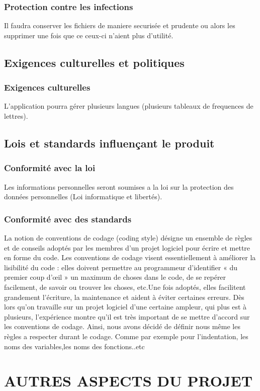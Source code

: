 \documentclass[a4]{article}
\begin{document}
			\subsubsection {Protection contre les infections}
				Il faudra conserver les fichiers de maniere securisée et prudente ou alors les supprimer une 					fois que ce ceux-ci n'aient plus d'utilité.
		\subsection{Exigences culturelles et politiques}
			\subsubsection {Exigences culturelles}
				L'application pourra gérer plusieurs langues (plusieurs tableaux de frequences de lettres).
		\subsection{Lois et standards influençant le produit}
			\subsubsection {Conformité avec la loi}
				Les informations personnelles seront soumises a la loi sur la protection des données
				personnelles (Loi informatique et libertés).
			\subsubsection {Conformité avec des standards}
La notion de conventions de codage (coding style) désigne un ensemble de règles et de conseils 
adoptés par les membres d’un projet logiciel pour écrire et mettre en forme du code.
Les conventions de codage visent essentiellement à améliorer la lisibilité du code : elles doivent 
permettre au programmeur d’identifier « du premier coup d’œil » un maximum de choses dans 
le  code, de se repérer facilement, de savoir ou trouver les choses, etc.Une fois adoptés, elles
facilitent grandement l’écriture, la maintenance et aident à éviter certaines erreurs.
Dès lors qu’on travaille sur un projet logiciel d’une certaine ampleur, qui plus est à
plusieurs, l’expérience montre qu’il est très important de se mettre d’accord sur les
conventions de codage. Ainsi, nous avons décidé de définir nous même les règles a respecter durant le codage. Comme par exemple pour l'indentation, les noms des variables,les noms des fonctions..etc
\section{AUTRES ASPECTS DU PROJET}
\end{document}
